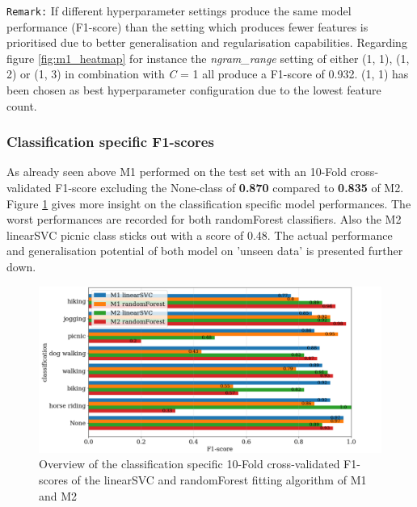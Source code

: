 \texttt{Remark:} If different hyperparameter settings produce the same model performance (F1-score) than the setting which produces fewer features is prioritised due to better generalisation and regularisation capabilities. Regarding figure \ref{fig:m1_heatmap} for instance the \textit{ngram\_range} setting of either (1, 1), (1, 2) or (1, 3) in combination with \textit{C} = 1 all produce a F1-score of 0.932. (1, 1) has been chosen as best hyperparameter configuration due to the lowest feature count.

\subsubsection*{Classification specific F1-scores}
As already seen above M1 performed on the test set with an 10-Fold cross-validated F1-score excluding the None-class of \textbf{0.870} compared to \textbf{0.835} of M2. Figure \ref{fig:m1_m2_class_f1_scores} gives more insight on the classification specific model performances. The worst performances are recorded for both randomForest classifiers. Also the M2 linearSVC picnic class sticks out with a score of 0.48. The actual performance and generalisation potential of both model on 'unseen data' is presented further down.
\begin{figure}[h!]
   \centering
   \includegraphics[width=\textwidth]{img/m1_m2_class_f1_scores_bigger_font.pdf}
   \caption{Overview of the classification specific 10-Fold cross-validated F1-scores of the linearSVC and randomForest fitting algorithm of M1 and M2}
   \label{fig:m1_m2_class_f1_scores}
\end{figure}

